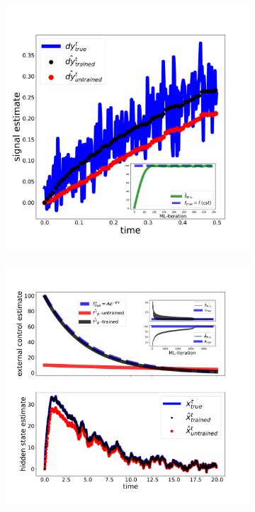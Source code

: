 \begin{figure}[t!]
    \centering
    \begin{subfigure}[b]{0.49\textwidth}
        \centering
        \includegraphics[width=1.\textwidth]{Figures/CMON/estimation/external_learn_signals.pdf}
        \caption{}
        \label{fig:forces1}
    \end{subfigure}
    \begin{subfigure}[b]{0.49\textwidth}
        \centering
        \includegraphics[width=1.\textwidth]{Figures/CMON/estimation/external_learn_track_example2.pdf}

\end{subfigure}
\end{figure}
